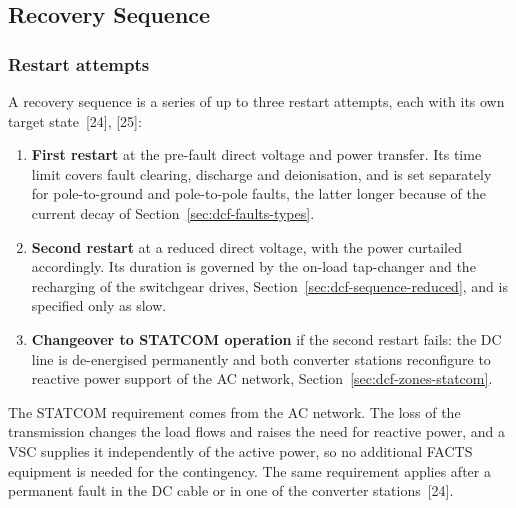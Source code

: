 \subsection{Recovery Sequence}
\label{sec:dcf-sequence}

\subsubsection{Restart attempts}
\label{sec:dcf-sequence-attempts}

A recovery sequence is a series of up to three restart attempts, each with
its own target state~[24], [25]:

\begin{enumerate}[itemsep=0.2em]
  \item \textbf{First restart} at the pre-fault direct voltage and power
        transfer. Its time limit covers fault clearing, discharge and
        deionisation, and is set separately for pole-to-ground and
        pole-to-pole faults, the latter longer because of the current decay
        of Section~\ref{sec:dcf-faults-types}.
  \item \textbf{Second restart} at a reduced direct voltage, with the power
        curtailed accordingly. Its duration is governed by the on-load
        tap-changer and the recharging of the switchgear drives,
        Section~\ref{sec:dcf-sequence-reduced}, and is specified only as
        slow.
  \item \textbf{Changeover to STATCOM operation} if the second restart fails:
        the DC line is de-energised permanently and both converter stations
        reconfigure to reactive power support of the AC network,
        Section~\ref{sec:dcf-zones-statcom}.
\end{enumerate}

The STATCOM requirement comes from the AC network. The loss of the
transmission changes the load flows and raises the need for reactive power,
and a VSC supplies it independently of the active power, so no additional
FACTS equipment is needed for the contingency. The same requirement applies
after a permanent fault in the DC cable or in one of the converter
stations~[24].

